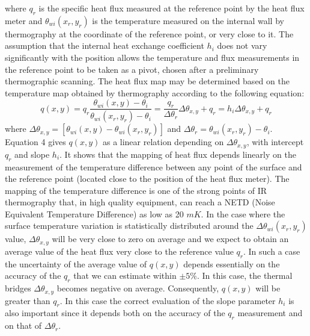 \documentclass{tQRT2e}
\begin{document}
where $ q_r $ is the specific heat flux measured at the reference point by the heat flux meter and $ \theta_{wi}(x_r,y_r) $ is the temperature measured on the internal wall by thermography at the coordinate of the reference point, or very close to it. The assumption that the internal heat exchange coefficient $ h_i $ does not vary significantly with the position allows the temperature and flux measurements in the reference point to be taken as a pivot, chosen after a preliminary thermographic scanning. The heat flux map may be determined based on the temperature map obtained by thermography according to the following equation:
\begin{equation}
q(x,y)=q_r\frac{\theta_{wi} (x,y)-\theta_i}{\theta_{wi} (x_r,y_r)-\theta_i}=\frac{q_r}{\Delta \theta_r}\Delta \theta_{x,y}+q_r=h_i \Delta \theta_{x,y}+q_r
\end{equation}
where $\Delta \theta_{x,y}=[\theta_{wi} (x,y)- \theta_{wi} (x_r,y_r)] $ and $ \Delta \theta_r =\theta_{wi}(x_r,y_r)- \theta_i $.\\
Equation 4 gives $ q(x,y) $ as a linear relation depending on  $ \Delta \theta_{x,y} $, with intercept $ q_r $ and slope $ h_i $. It shows that the mapping of heat flux depends linearly on the measurement of the temperature difference between any point of the surface and the reference point (located close to the position of the heat flux meter). The mapping of the temperature difference is one of the strong points of IR thermography that, in high quality equipment, can reach a NETD (Noise Equivalent Temperature Difference) as low as 20 $ mK $. In the case where the surface temperature variation is statistically distributed around the $ \Delta \theta_{wi}(x_r,y_r) $ value, $ \Delta \theta_{x,y} $ will be very close to zero on average and we expect to obtain an average value of the heat flux very close to the reference value $ q_r $. In such a case the uncertainty of the average value of $ q(x,y) $ depends essentially on the accuracy of the $ q_r $ that we can estimate within $ ± 5\% $. In this case, the thermal bridges $ \Delta \theta_{x,y}$ becomes negative on average. Consequently, $ q(x,y) $  will be greater than $ q_r $. In this case the correct evaluation of the slope parameter $ h_i $ is also important since it depends both on the accuracy of the $ q_r $ measurement and on that of $ \Delta \theta_{r} $.
\end{document}
